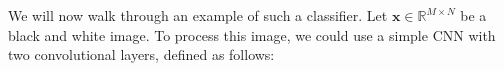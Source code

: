 
We will now walk through an example of such a classifier. Let $\mathbf{x} \in \mathbb{R}^{M \times N}$ be a black and white image. To process this image, we could use a simple CNN with two convolutional layers, defined as follows:



